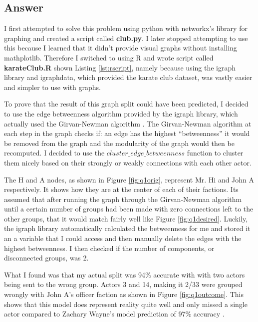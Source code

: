 \documentclass[letterpaper,11pt]{article}
\begin{document}
\clearpage
\subsection*{Answer}

I first attempted to solve this problem using python with networkx's library for graphing and created a script called \textbf{club.py}. I later stopped attempting to use this because I learned that it didn't provide visual graphs without installing mathplotlib. Therefore I switched to using R and wrote script called \textbf{karateClub.R} shown Listing \ref{lst:rscript}, namely because using the igraph library and igraphdata, which provided the karate club dataset, was vastly easier and simpler to use with graphs.

To prove that the result of this graph split could have been predicted, I decided to use the edge betweenness algorithm provided by the igraph library, which actually used the Girvan-Newman algorithm \cite{commref}. The Girvan-Newman algorithm at each step in the graph checks if: an edge has the highest ``betweenness'' it would be removed from the graph and the modularity of the graph would then be recomputed. I decided to use the $cluster\_edge\_betweenness$ function to cluster them nicely based on their strongly or weakly connections with each other actor.

The H and A nodes, as shown in Figure \ref{fig:q1orig}, represent Mr. Hi and John A respectively. It shows how they are at the center of each of their factions. Its assumed that after running the graph through the Girvan-Newman algorithm until a certain number of groups had been made with zero connections left to the other groups, that it would match fairly well like Figure \ref{fig:q1desired}. Luckily, the igraph library automatically calculated the betweenness for me and stored it an a variable that I could access and then manually delete the edges with the highest betweenness. I then checked if the number of components, or disconnected groups, was 2. 

What I found was that my actual split was 94\% accurate with with two actors being sent to the wrong group. Actors 3 and 14, making it 2/33 were grouped wrongly with John A's officer faction as shown in Figure \ref{fig:q1outcome}. This shows that this model does represent reality quite well and only missed a single actor compared to Zachary Wayne's model prediction of 97\% accuracy \cite{zachref}.
\end{document}

